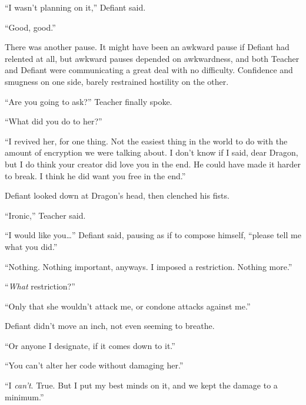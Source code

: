 ``I wasn't planning on it,'' Defiant said.



``Good, good.''



There was another pause.  It might have been an awkward pause if Defiant had relented at all, but awkward pauses depended on awkwardness, and both Teacher and Defiant were communicating a great deal with no difficulty.  Confidence and smugness on one side, barely restrained hostility on the other.



``Are you going to ask?'' Teacher finally spoke.



``What did you do to her?''



``I revived her, for one thing.  Not the easiest thing in the world to do with the amount of encryption we were talking about.  I don't know if I said, dear Dragon, but I do think your creator did love you in the end.  He could have made it harder to break.  I think he did want you free in the end.''



Defiant looked down at Dragon's head, then clenched his fists.



``Ironic,'' Teacher said.



``I would like you\ldots'' Defiant said, pausing as if to compose himself, ``\ldotsto please tell me what you did.''



``Nothing.  Nothing important, anyways.  I imposed a restriction.  Nothing more.''



``\emph{What} restriction?''



``Only that she wouldn't attack me, or condone attacks against me.''



Defiant didn't move an inch, not even seeming to breathe.



``Or anyone I designate, if it comes down to it.''



``You can't alter her code without damaging her.''



``I \emph{can't}.  True.  But I put my best minds on it, and we kept the damage to a minimum.''



